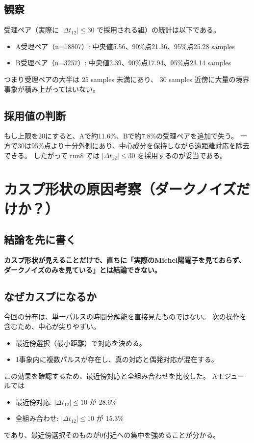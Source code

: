 \documentclass[a4paper,11pt]{jsarticle}
\begin{document}
\subsection{観察}
受理ペア（実際に $|\Delta t_{12}|\le30$ で採用される組）の統計は以下である。
\begin{itemize}
  \item A受理ペア（n=18807）: 中央値5.56、90\%点21.36、95\%点25.28 samples
  \item B受理ペア（n=3257）: 中央値2.39、90\%点17.94、95\%点23.14 samples
\end{itemize}

つまり受理ペアの大半は 25 samples 未満にあり、
30 samples 近傍に大量の境界事象が積み上がってはいない。

\subsection{採用値の判断}
もし上限を20にすると、Aで約11.6\%、Bで約7.8\%の受理ペアを追加で失う。
一方で30は95\%点より十分外側にあり、中心成分を保持しながら遠距離対応を除去できる。
したがって run8 では $|\Delta t_{12}|\le30$ を採用するのが妥当である。

\section{カスプ形状の原因考察（ダークノイズだけか？）}
\subsection{結論を先に書く}
\textbf{カスプ形状が見えることだけで、直ちに「実際のMichel陽電子を見ておらず、ダークノイズのみを見ている」とは結論できない。}

\subsection{なぜカスプになるか}
今回の分布は、単一パルスの時間分解能を直接見たものではない。
次の操作を含むため、中心が尖りやすい。
\begin{itemize}
  \item 最近傍選択（最小距離）で対応を決める。
  \item 1事象内に複数パルスが存在し、真の対応と偶発対応が混在する。
\end{itemize}

この効果を確認するため、最近傍対応と全組み合わせを比較した。
Aモジュールでは
\begin{itemize}
  \item 最近傍対応: $|\Delta t_{12}|\le10$ が 28.6\%
  \item 全組み合わせ: $|\Delta t_{12}|\le10$ が 15.3\%
\end{itemize}
であり、最近傍選択そのものが0付近への集中を強めることが分かる。
\end{document}

